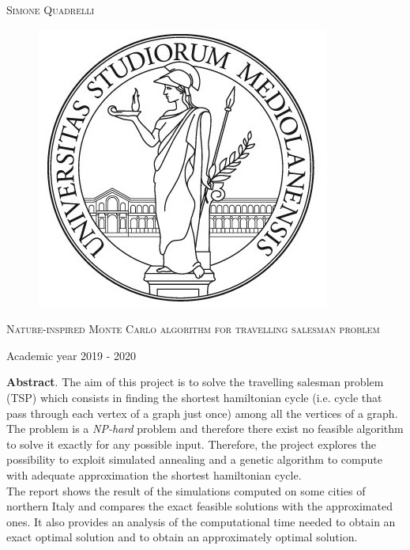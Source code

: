 \documentclass{article}
\begin{document}
\begin{titlepage}
	
	
	\begin{center}
		\vspace{2 cm}
		{\Large \textsc{Simone Quadrelli} }
	\end{center}
	
	
	\begin{figure}[H]
		\vspace{2 cm}
		\centering
		\includegraphics[width=0.30\linewidth]{tesiSCIENZE_TECNOLOGIE.jpg}
		
	\end{figure}
	
	\begin{center}
		\vspace{2 cm}
		{\Large \textsc{Nature-inspired Monte Carlo algorithm for travelling salesman problem} }
	\end{center}

	\par
	\vspace{3 cm}
	
	\begin{center}
		{\large Academic year 2019 - 2020}
	\end{center}
\end{titlepage}

\newpage 
{}
\tableofcontents
\listoffigures
\newpage

\noindent \textbf{Abstract}. The aim of this project is to solve the travelling salesman problem (TSP) which consists in finding the shortest hamiltonian cycle (i.e. cycle that pass through each vertex of a graph just once) among all the vertices of a graph. \\
The problem is a \textit{NP-hard} problem and therefore there exist no feasible algorithm to solve it exactly for any possible input. Therefore, the project explores the possibility to exploit simulated annealing and a genetic algorithm to compute with adequate approximation the shortest hamiltonian cycle.\\
The report shows the result of the simulations computed on some cities of northern Italy and compares the exact feasible solutions with the approximated ones. It also provides an analysis of the computational time needed to obtain an exact optimal solution and to obtain an approximately optimal solution.
\end{document}
